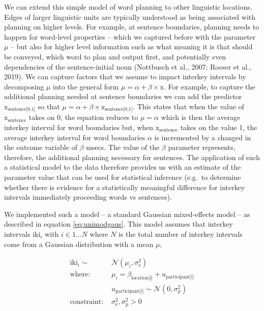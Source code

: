 \documentclass[
  man,floatsintext]{apa7}
\begin{document}
We can extend this simple model of word planning to other linguistic locations. Edges of larger linguistic units are typically understood as being associated with planning on higher levels. For example, at sentence boundaries, planning needs to happen for word-level properties -- which we captured before with the parameter \(\mu\) -- but also for higher level information such as what meaning it is that should be conveyed, which word to plan and output first, and potentially even dependencies of the sentence-initial noun (Nottbusch et al., 2007; Roeser et al., 2019). We can capture factors that we assume to impact interkey intervals by decomposing \(\mu\) into the general form \(\mu = \alpha + \beta \times \text{x}\). For example, to capture the additional planning needed at sentence boundaries we can add the predictor \(\text{x}_\text{sentence[0,1]}\) so that \(\mu = \alpha + \beta \times \text{x}_\text{sentence[0,1]}\). This states that when the value of \(\text{x}_\text{sentence}\) takes on 0, the equation reduces to \(\mu = \alpha\) which is then the average interkey interval for word boundaries but, when \(\text{x}_\text{sentence}\) takes on the value 1, the average interkey interval for word boundaries \(\alpha\) is incremented by a changed in the outcome variable of \(\beta\) msecs. The value of the \(\beta\) parameter represents, therefore, the additional planning necessary for sentences. The application of such a statistical model to the data therefore provides us with an estimate of the parameter value that can be used for statistical inference (e.g.~to determine whether there is evidence for a statistically meaningful difference for interkey intervals immediately proceeding words vs sentences).

We implemented such a model -- a standard Gaussian mixed-effects model -- as described in equation \ref{eq:unimodgaus}. This model assumes that interkey intervals \(\text{iki}_i\) with \(i \in 1 \ldots N\) where \(N\) is the total number of interkey intervals come from a Gaussian distribution with a mean \(\mu\),

\begin{equation}
\begin{aligned}
\label{eq:unimodgaus}
\text{iki}_i \sim\text{ } & \mathcal{N}(\mu_i, \sigma_\text{e}^2)\\
\text{where: } & \mu_i = \beta_\text{location[i]} + u_\text{participant[i]}\\
& u_\text{participant[i]} \sim \mathcal{N}(0, \sigma_\text{p}^2)\\
\text{constraint: } & \sigma_\text{e}^2, \sigma_\text{p}^2>0
\end{aligned}
\end{equation}
\end{document}
